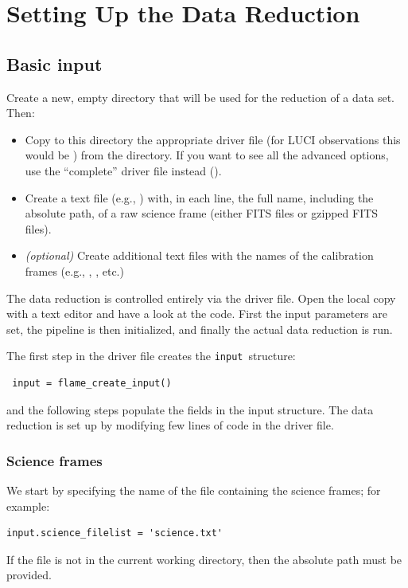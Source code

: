 \documentclass[a4paper]{article}
\newcommand{\inp}{\texttt{input}}
\begin{document}
\begin{sloppypar}
\section{Setting Up the Data Reduction}
\label{sec:setup}


\subsection{Basic input}

Create a new, empty directory that will be used for the reduction of a data set. Then:
\begin{itemize}
\item Copy to this directory the appropriate driver file (for LUCI observations this would be ) from the  directory. If you want to see all the advanced options, use the ``complete'' driver file instead ().
\item Create a text file (e.g., ) with, in each line, the full name, including the absolute path, of a raw science frame (either FITS files or gzipped FITS files).
\item \emph{(optional)} Create additional text files with the names of the calibration frames (e.g., , , etc.)
\end{itemize}

The data reduction is controlled entirely via the driver file. Open the local copy with a text editor and have a look at the code. First the input parameters are set, the pipeline is then initialized, and finally the actual data reduction is run.

The first step in the driver file creates the \inp\ structure:
\begin{lstlisting}
 input = flame_create_input()
\end{lstlisting}
and the following steps populate the fields in the input structure. The data reduction is set up by modifying few lines of code in the driver file.

\subsubsection{Science frames}
We start by specifying the name of the file containing the science frames; for example:
\begin{lstlisting}
input.science_filelist = 'science.txt'
\end{lstlisting}
If the file is not in the current working directory, then the absolute path must be provided.


\end{sloppypar}
\end{document}
